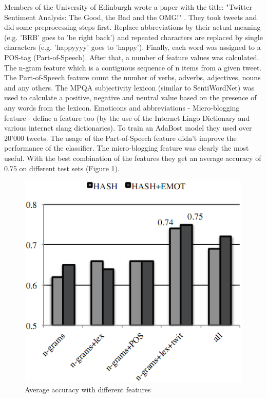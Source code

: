 \documentclass[a4paper]{article}
\begin{document}
Members of the University of Edinburgh wrote a paper with the title: "Twitter Sentiment Analysis: The Good, the Bad and the OMG!" \cite{sentimentAnalysisEdin}. They took tweets and did some preprocessing steps first. Replace abbreviations by their actual meaning (e.g. 'BRB' goes to 'be right back') and repeated characters are replaced by single characters (e.g. 'happyyyy' goes to 'happy'). Finally, each word was assigned to a POS-tag (Part-of-Speech). After that, a number of feature values was calculated. The n-gram feature which is a contiguous sequence of n items from a given tweet. The Part-of-Speech feature count the number of verbs, adverbs, adjectives, nouns and any others. The MPQA subjectivity lexicon (similar to SentiWordNet) was used to calculate a positive, negative and neutral value based on the presence of any words from the lexicon. Emoticons and abbreviations - Micro-blogging feature - define a feature too (by the use of the Internet Lingo Dictionary and various internet slang dictionaries). To train an AdaBost model they used over 20'000 tweets. The usage of the Part-of-Speech feature didn't improve the performance of the classifier. The micro-blogging feature was clearly the most useful. With the best combination of the features they get an average accuracy of 0.75 on different test sets (Figure \ref{sentimentAccuracy}).
\begin{figure}[h!]
	\centering
	\includegraphics[scale=0.5]{images/sentimentAccuracy.png}
	\caption{Average accuracy with different features}
	\label{sentimentAccuracy}
\end{figure}
\end{document}
